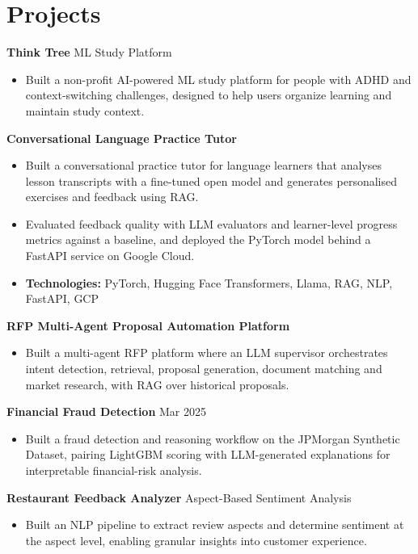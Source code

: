 \documentclass[10pt,a4paper]{article}
\begin{document}
\section{Projects}
\textbf{Think Tree} \textbar{} ML Study Platform\par
\begin{itemize}
  \item Built a non-profit AI-powered ML study platform for people with ADHD and context-switching challenges, designed to help users organize learning and maintain study context.
\end{itemize}
\textbf{Conversational Language Practice Tutor}\par
\begin{itemize}
  \item Built a conversational practice tutor for language learners that analyses lesson transcripts with a fine-tuned open model and generates personalised exercises and feedback using RAG.
  \item Evaluated feedback quality with LLM evaluators and learner-level progress metrics against a baseline, and deployed the PyTorch model behind a FastAPI service on Google Cloud.
  \item \textbf{Technologies:} PyTorch, Hugging Face Transformers, Llama, RAG, NLP, FastAPI, GCP
\end{itemize}
\textbf{RFP Multi-Agent Proposal Automation Platform}\par
\begin{itemize}
  \item Built a multi-agent RFP platform where an LLM supervisor orchestrates intent detection, retrieval, proposal generation, document matching and market research, with RAG over historical proposals.
\end{itemize}
\textbf{Financial Fraud Detection} \textbar{} Mar 2025\par
\begin{itemize}
  \item Built a fraud detection and reasoning workflow on the JPMorgan Synthetic Dataset, pairing LightGBM scoring with LLM-generated explanations for interpretable financial-risk analysis.
\end{itemize}
\textbf{Restaurant Feedback Analyzer} \textbar{} Aspect-Based Sentiment Analysis\par
\begin{itemize}
  \item Built an NLP pipeline to extract review aspects and determine sentiment at the aspect level, enabling granular insights into customer experience.
\end{itemize}
\end{document}
